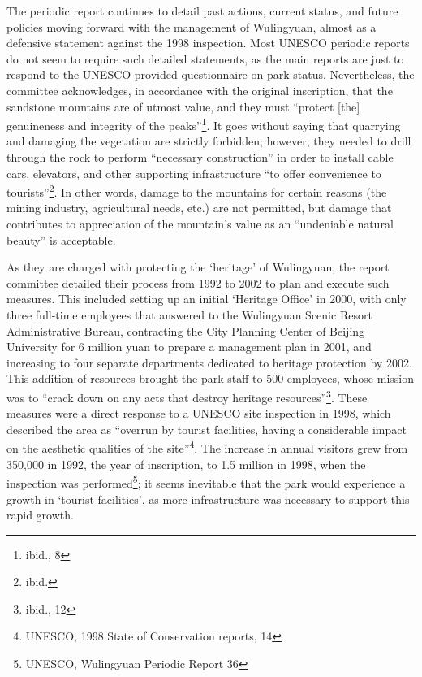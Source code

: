 The periodic report continues to detail past actions, current status, and future
policies moving forward with the management of Wulingyuan, almost as a defensive
statement against the 1998 inspection. Most UNESCO periodic reports do not seem
to require such detailed statements, as the main reports are just to respond to
the UNESCO-provided questionnaire on park status. Nevertheless, the committee
acknowledges, in accordance with the original inscription, that the sandstone
mountains are of utmost value, and they must ``protect [the] genuineness and
integrity of the peaks''\footnote{ibid., 8}. It goes without saying that
quarrying and damaging the vegetation are strictly forbidden; however, they
needed to drill through the rock to perform ``necessary construction'' in order
to install cable cars, elevators, and other supporting infrastructure ``to offer
convenience to tourists''\footnote{ibid.}. In other words, damage to the
mountains for certain reasons (the mining industry, agricultural needs, etc.)
are not permitted, but damage that contributes to appreciation of the mountain's
value as an ``undeniable natural beauty'' is acceptable.

As they are charged with protecting the `heritage' of Wulingyuan, the report
committee detailed their process from 1992 to 2002 to plan and execute such
measures. This included setting up an initial `Heritage Office' in 2000, with
only three full-time employees that answered to the Wulingyuan Scenic Resort
Administrative Bureau, contracting the City Planning Center of Beijing
University for 6 million yuan to prepare a management plan in 2001, and
increasing to four separate departments dedicated to heritage protection by
2002. This addition of resources brought the park staff to 500 employees, whose
mission was to ``crack down on any acts that destroy heritage
resources''\footnote{ibid., 12}. These measures were a direct response to a
UNESCO site inspection in 1998, which described the area as ``overrun by tourist
facilities, having a considerable impact on the aesthetic qualities of the
site''\footnote{UNESCO, 1998 State of Conservation reports, 14}. The increase in
annual visitors grew from 350,000 in 1992, the year of inscription, to 1.5
million in 1998, when the inspection was performed\footnote{UNESCO, Wulingyuan
Periodic Report 36}; it seems inevitable that the park would experience a growth
in `tourist facilities', as more infrastructure was necessary to support this
rapid growth.

